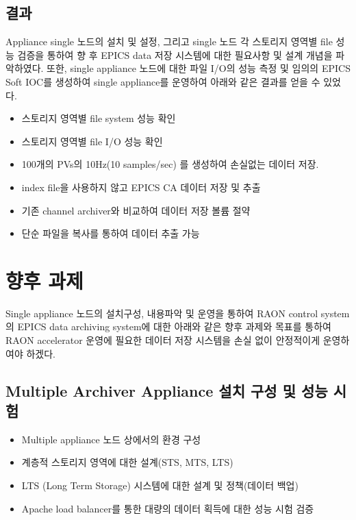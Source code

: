 \documentclass[11pt
  , a4paper
  , article
  , oneside
]{memoir}
\begin{document}
\section{결과}
Appliance single 노드의 설치 및 설정, 그리고 single 노드 각 스토리지 영역별 file 성능 검증을 통하여 향 후 EPICS data 저장 시스템에 대한 필요사항 및 설계 개념을 파악하였다. 또한, single appliance 노드에 대한 파일 I/O의 성능 측정 및 임의의 EPICS Soft IOC를 생성하여 single appliance를 운영하여 아래와 같은 결과를 얻을 수 있었다.

\begin{itemize}
	\item 스토리지 영역별 file system 성능 확인
	\item 스토리지 영역별 file I/O 성능 확인
	\item 100개의 PVs의 10Hz(10 samples/sec) 를 생성하여 손실없는 데이터 저장.
	\item index file을 사용하지 않고 EPICS CA 데이터 저장 및 추출
	\item 기존 channel archiver와 비교하여 데이터 저장 볼륨 절약
	\item 단순 파일을 복사를 통하여 데이터 추출 가능
\end{itemize}

\clearpage

\chapter{향후 과제}
Single appliance 노드의 설치구성, 내용파악 및 운영을 통하여 RAON control system의 EPICS data archiving system에 대한 아래와 같은 향후 과제와 목표를 통하여 RAON accelerator 운영에 필요한 데이터 저장 시스템을 손실 없이 안정적이게 운영하여야 하겠다.

\section{Multiple Archiver Appliance 설치 구성 및 성능 시험}
\begin{itemize}
	\item Multiple appliance 노드 상에서의 환경 구성
	\item 계층적 스토리지 영역에 대한 설계(STS, MTS, LTS)
	\item LTS (Long Term Storage) 시스템에 대한 설계 및 정책(데이터 백업)
	\item Apache load balancer를 통한 대량의 데이터 획득에 대한 성능 시험 검증
	
\end{itemize}
\end{document}
